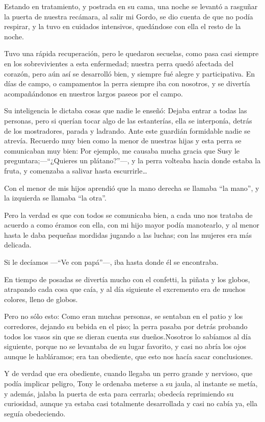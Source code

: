 \documentclass[letterpaper, 12pt]{book}
\begin{document}
Estando en tratamiento, y postrada en su cama, una noche se levantó a rasguñar la puerta de nuestra recámara, al salir mi Gordo, se dio cuenta de que no podía respirar, y  la tuvo en cuidados intensivos, quedándose con ella el resto de la noche.

Tuvo una rápida recuperación, pero le quedaron secuelas, como pasa casi siempre en los sobrevivientes a esta enfermedad; nuestra perra quedó afectada del corazón, pero aún así se desarrolló bien, y siempre fué alegre y participativa. En días de campo, o campamentos la perra siempre iba con nosotros, y se divertía acompañándonos en nuestros largos paseos por el campo.

Su inteligencia le dictaba cosas que nadie le enseñó: Dejaba entrar a todas las personas, pero si querían tocar algo de las estanterías, ella se interponía, detrás de los mostradores, parada y ladrando. Ante este guardián formidable nadie se atrevía.
Recuerdo muy bien como la menor de nuestras hijas y esta perra se comunicaban muy bien: Por ejemplo, me causaba mucha gracia que Susy le preguntara;---``¿Quieres un plátano?''---, y la perra volteaba hacia donde estaba la fruta, y comenzaba a salivar hasta escurrirle\ldots

Con el menor de mis hijos aprendió que la mano derecha se llamaba ``la mano'', y la izquierda se llamaba ``la otra''. 

Pero la verdad es que con todos se comunicaba bien, a cada uno nos trataba de acuerdo a como éramos con ella, con mi hijo mayor podía manotearlo, y al menor hasta le daba pequeñas mordidas jugando a las luchas; con las mujeres era más delicada.  

Si le decíamos ---``Ve con papá''---, iba hasta donde él se encontraba.

En tiempo de posadas se divertía mucho con el confetti, la piñata y los globos, atrapando cada cosa que caía, y al día siguiente el excremento era de muchos colores, lleno de globos. 

Pero no sólo esto: Como eran muchas personas, se sentaban en el patio y los corredores, dejando su bebida en el piso; la perra pasaba por detrás probando todos los vasos sin que se dieran cuenta sus dueños.Nosotros lo sabíamos al día siguiente, porque no se levantaba de su lugar favorito, y casi no abría los ojos aunque le habláramos; era tan obediente, que esto nos hacía sacar conclusiones.

Y de verdad que era obediente, cuando llegaba un perro grande y nervioso, que podía implicar peligro, Tony le ordenaba meterse a su jaula, al instante se metía, y además, jalaba la puerta de esta para cerrarla; obedecía reprimiendo su curiosidad, aunque ya estaba casi totalmente desarrollada y casi no cabía ya, ella seguía obedeciendo.
\end{document}
